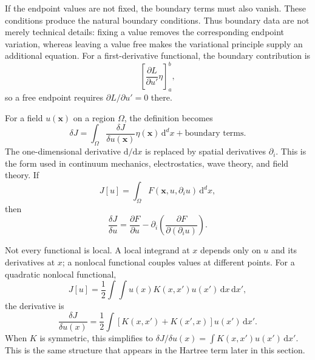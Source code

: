If the endpoint values are not fixed, the boundary terms must also vanish. These conditions produce the natural boundary conditions. Thus boundary data are not merely technical details: fixing a value removes the corresponding endpoint variation, whereas leaving a value free makes the variational principle supply an additional equation. For a first-derivative functional, the boundary contribution is
\begin{equation}
\left[\frac{\partial L}{\partial u'}\eta\right]_a^b,
\end{equation}
so a free endpoint requires $\partial L/\partial u'=0$ there.

For a field $u(\mathbf{x})$ on a region $\Omega$, the definition becomes
\begin{equation}
\delta J=\int_\Omega\frac{\delta J}{\delta u(\mathbf{x})}
\eta(\mathbf{x})\,\mathrm{d}^d x
+\text{boundary terms}.
\end{equation}
The one-dimensional derivative $\mathrm{d}/\mathrm{d}x$ is replaced by spatial derivatives $\partial_i$. This is the form used in continuum mechanics, electrostatics, wave theory, and field theory. If
\begin{equation}
J[u]=\int_\Omega F(\mathbf{x},u,\partial_i u)\,\mathrm{d}^d x,
\end{equation}
then
\begin{equation}
\frac{\delta J}{\delta u}
=\frac{\partial F}{\partial u}
-\partial_i\left(\frac{\partial F}{\partial(\partial_i u)}\right).
\end{equation}

Not every functional is local. A local integrand at $x$ depends only on $u$ and its derivatives at $x$; a nonlocal functional couples values at different points. For a quadratic nonlocal functional,
\begin{equation}
J[u]=\frac12\int\!\int u(x)K(x,x')u(x')\,\mathrm{d}x\,\mathrm{d}x',
\end{equation}
the derivative is
\begin{equation}
\frac{\delta J}{\delta u(x)}
=\frac12\int\left[K(x,x')+K(x',x)\right]u(x')\,\mathrm{d}x'.
\end{equation}
When $K$ is symmetric, this simplifies to $\delta J/\delta u(x)=\int K(x,x')u(x')\,\mathrm{d}x'$. This is the same structure that appears in the Hartree term later in this section.

